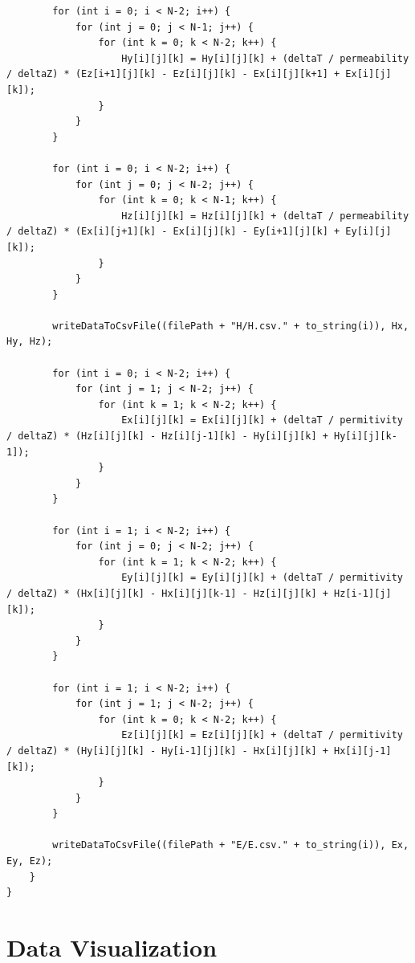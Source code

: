 \begin{verbatim}
		for (int i = 0; i < N-2; i++) {
			for (int j = 0; j < N-1; j++) {
				for (int k = 0; k < N-2; k++) {
					Hy[i][j][k] = Hy[i][j][k] + (deltaT / permeability / deltaZ) * (Ez[i+1][j][k] - Ez[i][j][k] - Ex[i][j][k+1] + Ex[i][j][k]);
				}
			}
		}
		
		for (int i = 0; i < N-2; i++) {
			for (int j = 0; j < N-2; j++) {
				for (int k = 0; k < N-1; k++) {
					Hz[i][j][k] = Hz[i][j][k] + (deltaT / permeability / deltaZ) * (Ex[i][j+1][k] - Ex[i][j][k] - Ey[i+1][j][k] + Ey[i][j][k]);
				}
			}
		}
		
		writeDataToCsvFile((filePath + "H/H.csv." + to_string(i)), Hx, Hy, Hz);
		
		for (int i = 0; i < N-2; i++) {
			for (int j = 1; j < N-2; j++) {
				for (int k = 1; k < N-2; k++) {
					Ex[i][j][k] = Ex[i][j][k] + (deltaT / permitivity / deltaZ) * (Hz[i][j][k] - Hz[i][j-1][k] - Hy[i][j][k] + Hy[i][j][k-1]);
				}
			}
		}
		
		for (int i = 1; i < N-2; i++) {
			for (int j = 0; j < N-2; j++) {
				for (int k = 1; k < N-2; k++) {
					Ey[i][j][k] = Ey[i][j][k] + (deltaT / permitivity / deltaZ) * (Hx[i][j][k] - Hx[i][j][k-1] - Hz[i][j][k] + Hz[i-1][j][k]);
				}
			}
		}
		
		for (int i = 1; i < N-2; i++) {
			for (int j = 1; j < N-2; j++) {
				for (int k = 0; k < N-2; k++) {
					Ez[i][j][k] = Ez[i][j][k] + (deltaT / permitivity / deltaZ) * (Hy[i][j][k] - Hy[i-1][j][k] - Hx[i][j][k] + Hx[i][j-1][k]);
				}
			}
		}
		
		writeDataToCsvFile((filePath + "E/E.csv." + to_string(i)), Ex, Ey, Ez);
	}
}
\end{verbatim}

\section{Data Visualization}

